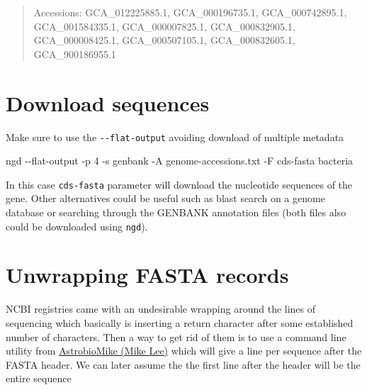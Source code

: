 \documentclass[
  letterpaper,
  DIV=11,
  numbers=noendperiod]{scrreprt}
\newenvironment{Shaded}{\begin{snugshade}}{\end{snugshade}}
\newcommand{\AttributeTok}[1]{\textcolor[rgb]{0.40,0.46,0.14}{#1}}
\newcommand{\ControlFlowTok}[1]{\textcolor[rgb]{0.00,0.46,0.62}{#1}}
\newcommand{\ExtensionTok}[1]{\textcolor[rgb]{0.00,0.46,0.62}{#1}}
\newcommand{\FunctionTok}[1]{\textcolor[rgb]{0.28,0.35,0.67}{#1}}
\newcommand{\KeywordTok}[1]{\textcolor[rgb]{0.00,0.46,0.62}{#1}}
\newcommand{\NormalTok}[1]{\textcolor[rgb]{0.00,0.46,0.62}{#1}}
\newcommand{\OperatorTok}[1]{\textcolor[rgb]{0.37,0.37,0.37}{#1}}
\newcommand{\PreprocessorTok}[1]{\textcolor[rgb]{0.68,0.00,0.00}{#1}}
\newcommand{\VariableTok}[1]{\textcolor[rgb]{0.07,0.07,0.07}{#1}}
\begin{document}
\begin{quote}
Accessions: GCA\_012225885.1, GCA\_000196735.1, GCA\_000742895.1,
GCA\_001584335.1, GCA\_000007825.1, GCA\_000832905.1, GCA\_000008425.1,
GCA\_000507105.1, GCA\_000832605.1, GCA\_900186955.1
\end{quote}

\hypertarget{download-sequences}{%
\section*{Download sequences}\label{download-sequences}}

Make sure to use the \texttt{-\/-flat-output} avoiding download of
multiple metadata

\begin{Shaded}
\begin{Highlighting}[]
\ExtensionTok{ngd} \AttributeTok{{-}{-}flat{-}output} \AttributeTok{{-}p}\NormalTok{ 4 }\AttributeTok{{-}s}\NormalTok{ genbank }\AttributeTok{{-}A}\NormalTok{ genome{-}accessions.txt }\AttributeTok{{-}F}\NormalTok{ cds{-}fasta bacteria}
\end{Highlighting}
\end{Shaded}

In this case \texttt{cds-fasta} parameter will download the nucleotide
sequences of the gene. Other alternatives could be useful such as blast
search on a genome database or searching through the GENBANK annotation
files (both files also could be downloaded using \texttt{ngd}).

\hypertarget{unwrapping-fasta-records}{%
\section*{Unwrapping FASTA records}\label{unwrapping-fasta-records}}

NCBI registries came with an undesirable wrapping around the lines of
sequencing which basically is inserting a return character after some
established number of characters. Then a way to get rid of them is to
use a command line utility from
\href{https://github.com/AstrobioMike}{AstrobioMike (Mike Lee)} which
will give a line per sequence after the FASTA header. We can later
assume the the first line after the header will be the entire sequence

\begin{Shaded}
\end{Shaded}
\end{document}
